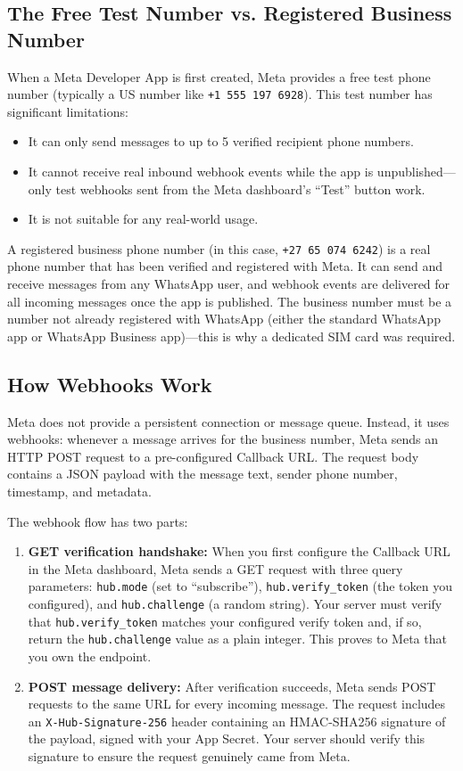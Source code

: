 \documentclass[12pt, a4paper]{report}
\begin{document}
\subsection{The Free Test Number vs. Registered Business Number}

When a Meta Developer App is first created, Meta provides a free test phone number (typically a US number like \texttt{+1 555 197 6928}). This test number has significant limitations:

\begin{itemize}[itemsep=3pt]
    \item It can only send messages to up to 5 verified recipient phone numbers.
    \item It cannot receive real inbound webhook events while the app is unpublished---only test webhooks sent from the Meta dashboard's ``Test'' button work.
    \item It is not suitable for any real-world usage.
\end{itemize}

A registered business phone number (in this case, \texttt{+27 65 074 6242}) is a real phone number that has been verified and registered with Meta. It can send and receive messages from any WhatsApp user, and webhook events are delivered for all incoming messages once the app is published. The business number must be a number not already registered with WhatsApp (either the standard WhatsApp app or WhatsApp Business app)---this is why a dedicated SIM card was required.

\subsection{How Webhooks Work}

Meta does not provide a persistent connection or message queue. Instead, it uses webhooks: whenever a message arrives for the business number, Meta sends an HTTP POST request to a pre-configured Callback URL. The request body contains a JSON payload with the message text, sender phone number, timestamp, and metadata.

The webhook flow has two parts:

\begin{enumerate}[itemsep=4pt]
    \item \textbf{GET verification handshake:} When you first configure the Callback URL in the Meta dashboard, Meta sends a GET request with three query parameters: \texttt{hub.mode} (set to ``subscribe''), \texttt{hub.verify\_token} (the token you configured), and \texttt{hub.challenge} (a random string). Your server must verify that \texttt{hub.verify\_token} matches your configured verify token and, if so, return the \texttt{hub.challenge} value as a plain integer. This proves to Meta that you own the endpoint.
    \item \textbf{POST message delivery:} After verification succeeds, Meta sends POST requests to the same URL for every incoming message. The request includes an \texttt{X-Hub-Signature-256} header containing an HMAC-SHA256 signature of the payload, signed with your App Secret. Your server should verify this signature to ensure the request genuinely came from Meta.
\end{enumerate}
\end{document}
